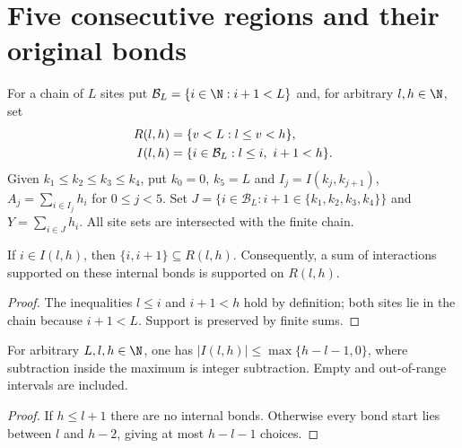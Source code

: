 \section{Five consecutive regions and their original bonds}

\begin{definition}
    \label{def:five_region_bond_partition}
    For a chain of $L$ sites put $\mathcal B_L=\{i\in\N:i+1<L\}$ and,
    for arbitrary $l,h\in\N$, set
    \begin{align}
        R(l,h) & =\{v<L:l\le v<h\},\notag              \\
        I(l,h) & =\{i\in\mathcal B_L:l\le i,\ i+1<h\}.
    \end{align}
    Given $k_1\le k_2\le k_3\le k_4$, put $k_0=0$, $k_5=L$ and
    $I_j=I(k_j,k_{j+1})$, $A_j=\sum_{i\in I_j}h_i$ for $0\le j<5$.
    Set $J=\{i\in\mathcal B_L:i+1\in\{k_1,k_2,k_3,k_4\}\}$ and
    $Y=\sum_{i\in J}h_i$. All site sets are intersected with the finite chain.
\end{definition}

\begin{lemma}
    \label{thm:internal_bond_region_subset}
    \leanok
    If $i\in I(l,h)$, then $\{i,i+1\}\subseteq R(l,h)$. Consequently,
    a sum of interactions supported on these internal bonds is supported on
    $R(l,h)$.
\end{lemma}
\begin{proof}
    \leanok
    The inequalities $l\le i$ and $i+1<h$ hold by definition; both sites
    lie in the chain because $i+1<L$. Support is preserved by finite sums.
\end{proof}

\begin{lemma}
    \label{thm:internal_bond_card_bound}
    \leanok
    For arbitrary $L,l,h\in\N$, one has
    $|I(l,h)|\le\max\{h-l-1,0\}$, where subtraction inside the maximum
    is integer subtraction. Empty and out-of-range intervals are included.
\end{lemma}
\begin{proof}
    \leanok
    If $h\le l+1$ there are no internal bonds. Otherwise every bond start
    lies between $l$ and $h-2$, giving at most $h-l-1$ choices.
\end{proof}

